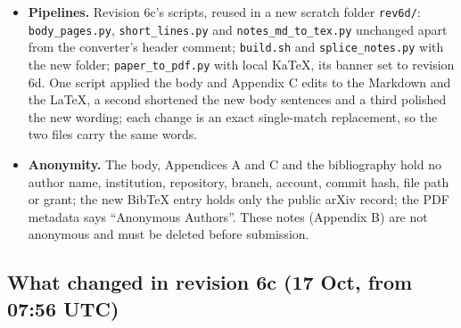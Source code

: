 \documentclass{article}
\theoremstyle{plain}
\theoremstyle{definition}
\theoremstyle{remark}
\begin{document}
\begin{itemize}
        for byte from revision 6c's notes before any edit (its header comment
        now says revision 6d).
  \item \textbf{Pipelines.} Revision 6c's scripts, reused in a new scratch
        folder \nolinkurl{rev6d/}: \nolinkurl{body_pages.py},
        \nolinkurl{short_lines.py} and \nolinkurl{notes_md_to_tex.py} unchanged
        apart from the converter's header comment; \nolinkurl{build.sh} and
        \nolinkurl{splice_notes.py} with the new folder;
        \nolinkurl{paper_to_pdf.py} with local KaTeX, its banner set to revision
        6d. One script applied the body and Appendix C edits to the Markdown and
        the LaTeX, a second shortened the new body sentences and a third
        polished the new wording; each change is an exact single-match
        replacement, so the two files carry the same words.
  \item \textbf{Anonymity.} The body, Appendices A and C and the bibliography
        hold no author name, institution, repository, branch, account, commit
        hash, file path or grant; the new BibTeX entry holds only the public
        arXiv record; the PDF metadata says ``Anonymous Authors''. These notes
        (Appendix B) are not anonymous and must be deleted before submission.
\end{itemize}

\subsection{What changed in revision 6c (17 Oct, from 07:56 UTC)}
\end{document}
